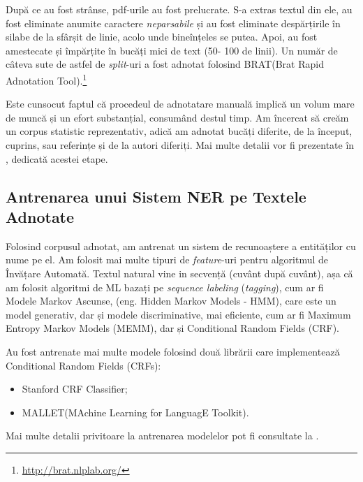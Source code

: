 După ce au fost strânse, pdf-urile au fost prelucrate. S-a extras textul din ele, au fost eliminate anumite caractere \textit{neparsabile} și au fost eliminate despărțirile în silabe de la sfârșit de linie, acolo unde bineînțeles se putea. Apoi, au fost amestecate și împărțite în bucăți mici de text (50- 100 de linii). Un număr de câteva sute de astfel de \textit{split}-uri a fost adnotat folosind BRAT(Brat Rapid Adnotation Tool).\footnote{\url{http://brat.nlplab.org/}}

Este cunsocut faptul că procedeul de adnotatare manuală implică un volum mare de muncă și un efort substanțial, consumând destul timp. Am încercat să creăm un corpus statistic reprezentativ, adică am adnotat bucăți diferite, de la început, cuprins, sau referințe și de la autori diferiți. Mai multe detalii vor fi prezentate în , dedicată acestei etape.

\subsection{Antrenarea unui Sistem NER pe Textele Adnotate}



Folosind corpusul adnotat, am antrenat un sistem de recunoaștere a entităților cu nume pe el. Am folosit mai multe tipuri de \textit{feature}-uri pentru algoritmul de Învățare Automată. Textul natural vine in secvență (cuvânt după cuvânt), așa că am folosit algoritmi de ML bazați pe \textit{sequence labeling} (\textit{tagging}), cum ar fi Modele Markov Ascunse, (eng. Hidden Markov Models - HMM), care este un model generativ, dar și modele discriminative, mai eficiente, cum ar fi Maximum Entropy Markov Models (MEMM), dar și Conditional Random Fields (CRF).

Au fost antrenate mai multe modele folosind două librării care implementează Conditional Random Fields (CRFs):
\begin{itemize}
\item Stanford CRF Classifier;
\item MALLET(MAchine Learning for LanguagE Toolkit).
\end{itemize}

Mai multe detalii privitoare la antrenarea modelelor pot fi consultate la .


